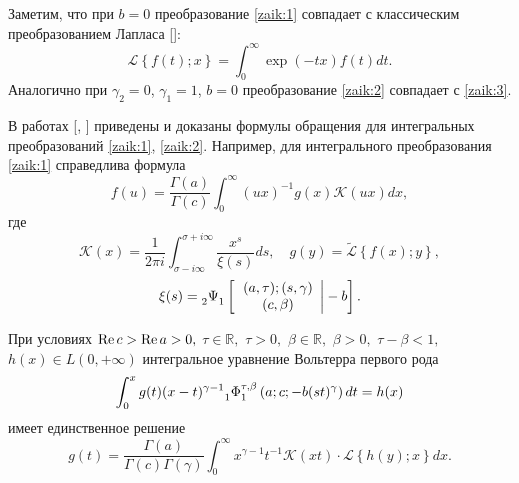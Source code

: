 Заметим, что при $b=0$ преобразование \eqref{zaik:1} совпадает с классическим преобразованием Лапласа []:
\begin{equation}
\label{zaik:3}
 \mathcal L\left\{f(t);x\right\}=  \int_0^{\infty}\exp(-tx)f(t)dt.
\end{equation}
Аналогично при $\gamma_2=0$, $\gamma_1=1$, $b=0$ преобразование \eqref{zaik:2} совпадает с \eqref{zaik:3}.
   
В работах  [, ] приведены и доказаны формулы обращения для интегральных преобразований \eqref{zaik:1}, \eqref{zaik:2}.
Например, для интегрального преобразования \eqref{zaik:1} справедлива формула
\begin{equation}
\label{zaik:4}
f(u)=\frac{\Gamma(a)}{\Gamma(c)}\int_0^{\infty}(ux)^{-1}g(x)\mathcal K(ux)dx,
 \end{equation}
где
\[
\mathcal K(x)=\frac{1}{2\pi i}\int_{\sigma-i\infty}^{\sigma+i\infty}\frac{x^s}{\xi(s)}ds,\quad 
g(y)=\widetilde{\mathcal L}\left\{f(x);y\right\},
\]\[
\xi(s)={\mathstrut}_2\Psi{\mathstrut}_1 \left[ \left. \begin{array}{c}
                    (a,\tau);(s,\gamma)\\
                    (c,\beta)
                    \end{array} \right| -b \right].
\]
 
 
 
 
 

\smallskip

\begin{theorem}[1]При условиях $\mathop{\rm Re} c>\mathop{\rm Re} a>0,$ 
$\tau\in \mathbb R,$ $\tau>0,$ $\beta\in \mathbb R,$ $\beta>0,$ $\tau-\beta<1,$ 
$h(x)\in L(0, +\infty)$
интегральное уравнение Вольтерра первого рода
\begin{equation}
\label{zaik:5}
\int_0^x g(t)(x-t)^{\gamma-1}{\mathstrut}_1\Phi{\mathstrut}_1^{\tau,\beta}\left(a; c; -b(st)^{\gamma}\right)dt=h(x)
\end{equation}
имеет единственное решение
\begin{equation}
\label{zaik:6}
g(t)=\frac{\Gamma(a)}{\Gamma(c)\Gamma(\gamma)}\int_0^{\infty} x^{\gamma-1}t^{-1}\mathcal K(xt)\cdot\mathcal L\left\{h(y);x\right\}dx.
 \end{equation}
\end{theorem}

